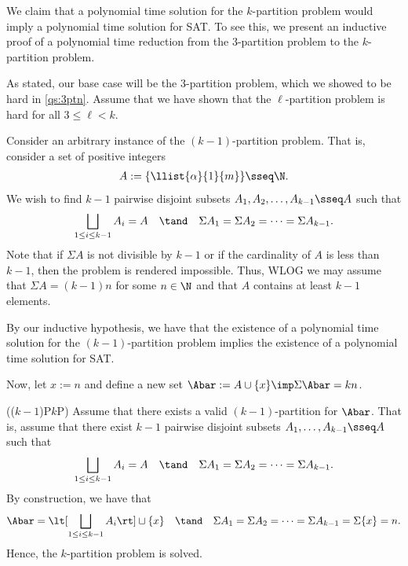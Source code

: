 \documentclass{article}
\begin{document}
\begin{solution}
  We claim that a polynomial time solution for the $ k $-partition problem would imply a polynomial time solution for SAT.
  To see this, we present an inductive proof of a polynomial time reduction from the 3-partition problem to the $ k $-partition problem.

  As stated, our base case will be the 3-partition problem, which we showed to be hard in \ref{qs:3ptn}.
  Assume that we have shown that the $ \ell $-partition problem is hard for all $ 3\leq\ell < k $.

  Consider an arbitrary instance of the $ (k-1) $-partition problem.
  That is, consider a set of positive integers \begin{align*}
    A := \{\llist{\alpha}{1}{m}\} \sseq \N.
  \end{align*}
  We wish to find $ k-1 $ pairwise disjoint subsets $ A_1,A_2,\ldots,A_{k-1}\sseq A $ such that \begin{align*}
    \bigsqcup_{1\leq i \leq k-1}A_{i} = A \quad \tand \quad \Sigma A_1 = \Sigma A_2 = \cdots = \Sigma A_{k-1}.
  \end{align*}
  Note that if $ \Sigma A $ is not divisible by $ k-1 $ or if the cardinality of $ A $ is less than $ k-1 $, then the problem is rendered impossible.
  Thus, WLOG we may assume that $ \Sigma A = (k-1)n $ for some $ n\in \N $ and that $ A $ contains at least $ k-1 $ elements.

  By our inductive hypothesis, we have that the existence of a polynomial time solution for the $ (k-1) $-partition problem implies the existence of a polynomial time solution for SAT.

  Now, let $ x := n $ and define a new set $ \Abar := A\cup \{x\}\imp \Sigma \Abar = kn $.

  \begin{subproof}[Correctness.]
    (($ k-1 $)P\imp $k$P)
    Assume that there exists a valid $ (k-1) $-partition for $ \Abar $.
    That is, assume that there exist $ k-1 $ pairwise disjoint subsets $ A_1,\ldots,A_{k-1}\sseq A $ such that \begin{align*}
      \bigsqcup_{1\leq i \leq k-1}A_{i} = A \quad \tand \quad \Sigma A_1 = \Sigma A_2 = \cdots = \Sigma A_{k-1}.
    \end{align*}
    By construction, we have that \begin{align*}
      \Abar = \lt[\bigsqcup_{1\leq i \leq k-1}A_{i}\rt] \sqcup \{x\} \quad \tand \quad \Sigma A_1 = \Sigma A_2 = \cdots = \Sigma A_{k-1} = \Sigma \{x\} = n.
    \end{align*}
    Hence, the $ k $-partition problem is solved.


\end{subproof}
\end{solution}
\end{document}
